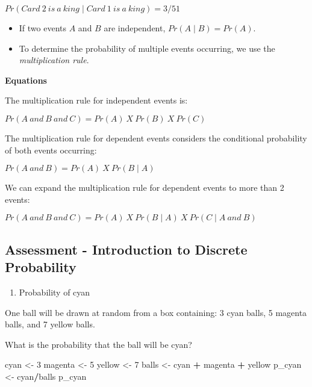 \documentclass[
]{article}
\newenvironment{Shaded}{\begin{snugshade}}{\end{snugshade}}
\newcommand{\DecValTok}[1]{\textcolor[rgb]{0.00,0.00,0.81}{#1}}
\newcommand{\NormalTok}[1]{#1}
\newcommand{\OperatorTok}[1]{\textcolor[rgb]{0.81,0.36,0.00}{\textbf{#1}}}
\newcommand{\StringTok}[1]{\textcolor[rgb]{0.31,0.60,0.02}{#1}}
\providecommand{\tightlist}{%
  \setlength{\itemsep}{0pt}\setlength{\parskip}{0pt}}
\begin{document}
\(Pr(Card\:2\:is\:a\:king \mid Card\:1\:is\:a\:king) = 3/51\)

\begin{itemize}
\tightlist
\item
  If two events \(A\) and \(B\) are independent,
  \(Pr(A \mid B) = Pr(A)\).
\item
  To determine the probability of multiple events occurring, we use the
  \emph{multiplication rule}.
\end{itemize}

\textbf{Equations}

The multiplication rule for independent events is:

\(Pr(A\:and\:B\:and\:C) = Pr(A)\:X\:Pr(B)\:X\:Pr(C)\)

The multiplication rule for dependent events considers the conditional
probability of both events occurring:

\(Pr(A\:and\:B) = Pr(A)\:X\:Pr(B \mid A)\)

We can expand the multiplication rule for dependent events to more than
2 events:

\(Pr(A\:and\:B\:and\:C) = Pr(A)\:X\:Pr(B \mid A)\:X\:Pr(C \mid A\:and\:B)\)

\hypertarget{assessment---introduction-to-discrete-probability}{%
\subsection{Assessment - Introduction to Discrete
Probability}\label{assessment---introduction-to-discrete-probability}}

\begin{enumerate}
\def\labelenumi{\arabic{enumi}.}
\tightlist
\item
  Probability of cyan
\end{enumerate}

One ball will be drawn at random from a box containing: 3 cyan balls, 5
magenta balls, and 7 yellow balls.

What is the probability that the ball will be cyan?

\begin{Shaded}
\begin{Highlighting}[]
\NormalTok{cyan <-}\StringTok{ }\DecValTok{3}
\NormalTok{magenta <-}\StringTok{ }\DecValTok{5}
\NormalTok{yellow <-}\StringTok{ }\DecValTok{7}
\NormalTok{balls <-}\StringTok{ }\NormalTok{cyan }\OperatorTok{+}\StringTok{ }\NormalTok{magenta }\OperatorTok{+}\StringTok{ }\NormalTok{yellow}
\NormalTok{p_cyan <-}\StringTok{ }\NormalTok{cyan}\OperatorTok{/}\NormalTok{balls}
\NormalTok{p_cyan}
\end{Highlighting}
\end{Shaded}
\end{document}
